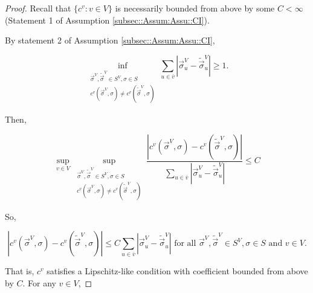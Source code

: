 \documentclass[12pt]{article}
\newcommand{\ov}{\overline}
\newcommand{\te}{\text}
\newcommand{\ind}{\hspace{24pt}}
\renewcommand{\v}{v}							%
\newcommand{\vv}{u}								%
\renewcommand{\S}{S}							%
\newcommand{\s}{\sigma}							%
\newcommand{\sv}{\vec{\s}}						%
\newcommand{\IGr}{c}							%
\newcommand{\vind}[1]{^{#1}}					%
\newcommand{\carp}[1]{^{#1}}					%
\newcommand{\vsi}[1]{^{#1}}						%
\newcommand{\cind}[1]{_{#1}}					%
\newcommand{\cl}{\ov}							%
\newcommand{\const}{C}							%
\newcommand{\alt}[1]{\widetilde{#1}}			%
\begin{document}
\begin{proof}
Recall that \(\{\IGr\vind{\v}:\v\in V\}\) is necessarily bounded from above by some \(\const < \infty\) (Statement 1 of Assumption \ref{subsec::Assum:Assu::CI}). 

\ind By statement 2 of Assumption \ref{subsec::Assum:Assu::CI}, 

\[\inf_{\substack{\sv\vsi{V},\alt{\sv}\vsi{V} \in \S\carp{V}, \s\in \S\\ \IGr\vind{\v}(\sv\vsi{V},\s) \neq \IGr\vind{\v}(\alt{\sv}\vsi{V},\s)}} \sum_{\vv \in \cl{\v}} |\sv\cind{\vv}\vsi{V} - \alt{\sv}\cind{\vv}\vsi{V}| \geq 1.\]

Then,

\[\sup_{\v\in V} \sup_{\substack{\sv\vsi{V},\alt{\sv}\vsi{V} \in \S\carp{V}, \s\in \S\\ \IGr\vind{\v}(\sv\vsi{V},\s) \neq \IGr\vind{\v}(\alt{\sv}\vsi{V},\s)}} \frac{|\IGr\vind{\v}(\sv\vsi{V},\s) - \IGr\vind{\v}(\alt{\sv}\vsi{V},\s)|}{\sum_{\vv \in \cl{\v}} |\sv\cind{\vv}\vsi{V} - \alt{\sv}\cind{\vv}\vsi{V}|} \leq \const\]

So,

\[|\IGr\vind{\v}(\sv\vsi{V},\s) - \IGr\vind{\v}(\alt{\sv}\vsi{V},\s)|\leq \const\sum_{\vv \in \cl{\v}} |\sv\cind{\vv}\vsi{V} - \alt{\sv}\cind{\vv}\vsi{V}| \te{ for all } \sv\vsi{V},\alt{\sv}\vsi{V}\in \S\carp{V},\s\in \S\te{ and }\v\in V.\]

That is, \(\IGr\vind{\v}\) satisfies a Lipschitz-like condition with coefficient bounded from above by \(\const\). For any \(\v\in V\),


\end{proof}
\end{document}
